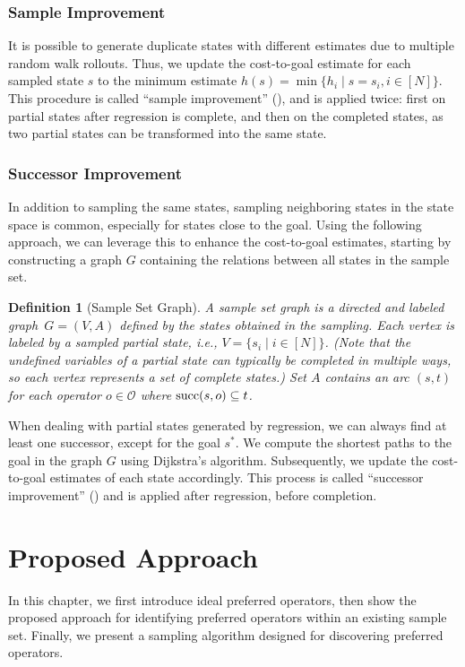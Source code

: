 \documentclass[ppgc,diss,english]{iiufrgs}
\newtheorem{definition}{Definition}
\begin{document}
\subsection{Sample Improvement}
\label{sec:sample-sai}
It is possible to generate duplicate states with different estimates due to multiple random walk rollouts. Thus, we update the cost-to-goal estimate for each sampled state $s$ to the minimum estimate $h(s) = \min\{h_i \mid s=s_i, i\in[N]\}$.
This procedure is called ``sample improvement'' (\sai), and is applied twice: first on partial states after regression is complete, and then on the completed states, as two partial states can be transformed into the same state.

\subsection{Successor Improvement}
\label{sec:sample-sui}
In addition to sampling the same states, sampling neighboring states in the state space is common, especially for states close to the goal. Using the following approach, we can leverage this to enhance the cost-to-goal estimates, starting by constructing a graph $G$ containing the relations between all states in the sample set.

\begin{definition}[Sample Set Graph]\label{def:graph}
A sample set graph is a directed and labeled graph~$G = (V, A)$ defined by the states obtained in the sampling. Each vertex is labeled by a sampled partial state, i.e., $V = \{s_i \mid i \in [N]\}$. (Note that the undefined variables of a partial state can typically be completed in multiple ways, so each vertex represents a set of complete states.) Set $A$ contains an arc $(s,t)$ for each operator $o \in \mathcal{O}$ where $\operatorname{succ}(s,o) \subseteq t$.
\end{definition}

When dealing with partial states generated by regression, we can always find at least one successor, except for the goal $s^{*}$. We compute the shortest paths to the goal in the graph $G$ using Dijkstra's algorithm. Subsequently, we update the cost-to-goal estimates of each state accordingly. This process is called ``successor improvement'' (\sui) and is applied after regression, before completion.

\chapter{Proposed Approach}
\label{cha:proposed-approach}
In this chapter, we first introduce ideal preferred operators, then show the proposed approach for identifying preferred operators within an existing sample set. Finally, we present a sampling algorithm designed for discovering preferred operators.
\end{document}

